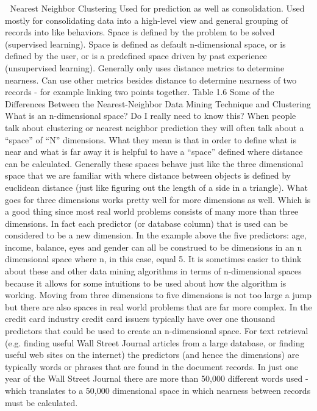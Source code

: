 
Nearest Neighbor 
Clustering 
Used for prediction as well as consolidation.
Used mostly for consolidating data into a high-level view and general grouping of records into like behaviors.
Space is defined by the problem to be solved (supervised learning).
Space is defined as default n-dimensional  space, or is defined by the user, or is a predefined space driven by past experience (unsupervised learning).
Generally only uses distance metrics to determine nearness.
Can use other metrics besides distance to determine nearness of two records - for example linking two points together.
Table 1.6  Some of the Differences Between the Nearest-Neighbor Data Mining Technique and Clustering
What is an n-dimensional space? Do I really need to know this?
When people talk about clustering or nearest neighbor prediction they will often talk about a “space” of “N” dimensions.  What they mean is that in order to define what is near and what is far away it is helpful to have a “space” defined where distance can be calculated.  Generally these spaces behave just like the three dimensional space that we are familiar with where distance between objects is defined by euclidean distance (just like figuring out the length of a side in a triangle). 
What goes for three dimensions works pretty well for more dimensions as well.  Which is a good thing since most real world problems consists of many more than three dimensions.  In fact each predictor (or database column) that is used can be considered to be a new dimension.  In the example above the five predictors: age, income, balance, eyes and gender can all be construed to be dimensions in an n dimensional space where n, in this case, equal 5.  It is sometimes easier to think about these and other data mining algorithms in terms of n-dimensional spaces because it allows for some intuitions to be used about how the algorithm is working.
Moving from three dimensions to five dimensions is not too large a jump but there are also spaces in real world problems that are far more complex.  In the credit card industry credit card issuers typically have over one thousand predictors that could be used to create an n-dimensional space.  For text retrieval (e.g. finding useful Wall Street Journal articles from a large database, or finding useful web sites on the internet) the predictors (and hence the dimensions) are typically words or phrases that are found in the document records.  In just one  year of the Wall Street Journal there are more than 50,000 different words used - which translates to a 50,000 dimensional space in which nearness between records must be calculated.
